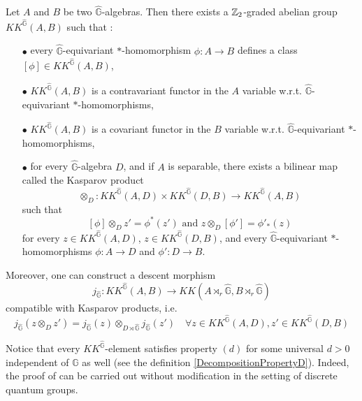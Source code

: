 \begin{prop}
Let $A$ and $B$ be two $\hat{\mathbb G}$-algebras. Then there exists a $\mathbb Z_2$-graded abelian group $KK^{\hat{\mathbb G}}(A,B) $ such that :
\begin{itemize}
\item[$\bullet$] every $\hat{\mathbb G}$-equivariant $*$-homomorphism $\phi : A\rightarrow B$ defines a class $[\phi]\in KK^{\hat{\mathbb G}}(A,B)$,
\item[$\bullet$] $KK^{\hat{\mathbb G}}(A,B)$ is a contravariant functor in the $A$ variable w.r.t. $\hat{\mathbb G}$-equivariant $*$-homomorphisms,
\item[$\bullet$] $KK^{\hat{\mathbb G}}(A,B)$ is a covariant functor in the $B$ variable w.r.t. $\hat{\mathbb G}$-equivariant $*$-homomorphisms,
\item[$\bullet$] for every $\hat{\mathbb G}$-algebra $D$, and if $A$ is separable, there exists a bilinear map called the Kasparov product 
\[\otimes_D : KK^{\hat{\mathbb G}}(A,D)\times KK^{\hat{\mathbb G}}(D,B)  \rightarrow  KK^{\hat{\mathbb G}}(A,B)\]
such that 
\[ [\phi]\otimes_D z' = \phi^*(z') \text{ and } z\otimes_D[\phi'] = \phi'_*(z)\]
for every $z\in KK^{\hat{\mathbb G}}(A,D)$, $z\in KK^{\hat{\mathbb G}}(D,B)$, and every $\hat{\mathbb G}$-equivariant $*$-homomorphisms $\phi : A \rightarrow D$ and $\phi' : D\rightarrow B$.
\end{itemize}
Moreover, one can construct a descent morphism
\[j_{\hat{\mathbb G}} : KK^{\hat{\mathbb G}}(A,B)\rightarrow KK(A\rtimes_r \hat{\mathbb G},B\rtimes_r \hat{\mathbb G})\]
compatible with Kasparov products, i.e. 
\[j_{\hat{\mathbb G}}(z\otimes_D z') = j_{\hat{\mathbb G}}(z)\otimes_{D\rtimes \hat{\mathbb G}} j_{\hat{\mathbb G}}(z')\quad \forall z\in KK^{\hat{\mathbb G}}(A,D),z'\in KK^{\hat{\mathbb G}}(D,B) \]
\end{prop}

Notice that every $KK^{\hat{\mathbb G}}$-element satisfies property $(d)$ for some universal $d>0$ independent of $\mathbb G$ as well (see the definition \ref{DecompositionPropertyD}). Indeed, the proof of \cite{LaffOY} can be carried out without modification in the setting of discrete quantum groups.































